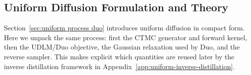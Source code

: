 \begin{reviewblock}

\subsection{Uniform Diffusion Formulation and Theory}
\label{app:uniform-formulation-theory}
Section~\ref{sec:uniform process duo} introduces uniform diffusion in compact form. Here we unpack the same process: first the CTMC generator and forward kernel, then the UDLM/Duo objective, the Gaussian relaxation used by Duo, and the reverse sampler. This makes explicit which quantities are reused later by the inverse distillation framework in Appendix~\ref{app:uniform-inverse-distillation}.


\end{reviewblock}

